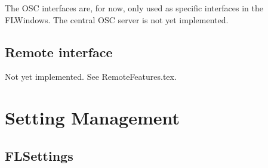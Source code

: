 \documentclass[a4paper]{article}
\begin{document}
The OSC interfaces are, for now, only used as specific interfaces in the FLWindows. The central OSC server is not yet implemented. 

\subsection{Remote interface}

Not yet implemented. See RemoteFeatures.tex.

\section{Setting Management}

\subsection{FLSettings \label{FLSettings}}
\end{document}
